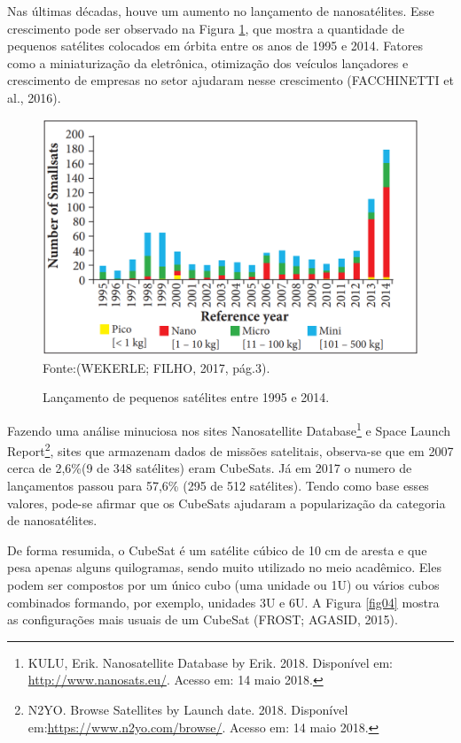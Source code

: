 Nas últimas décadas, houve um aumento no lançamento de nanosatélites. Esse crescimento pode ser observado na Figura \ref{fig03}, que mostra a quantidade de pequenos satélites colocados em órbita entre os anos de 1995 e 2014. Fatores como a miniaturização da eletrônica, otimização dos veículos lançadores e crescimento de empresas no setor ajudaram nesse crescimento (FACCHINETTI et al., 2016).

{\small
\begin{figure}[h]
	\centering
	\caption{Lançamento de pequenos satélites entre 1995 e 2014.}
	\includegraphics[keepaspectratio=true,scale=0.55]{figuras/lancamentoPequenoSatellite.PNG}
	Fonte:(WEKERLE; FILHO, 2017, pág.3).
	\label{fig03}
\end{figure}
}

Fazendo uma análise minuciosa nos sites Nanosatellite Database\footnote{ KULU, Erik. Nanosatellite Database by Erik. 2018. Disponível em: \url{http://www.nanosats.eu/}. Acesso em: 14 maio 2018.} e Space Launch Report\footnote{N2YO. Browse Satellites by Launch date. 2018. Disponível em:\url{https://www.n2yo.com/browse/}.  Acesso em: 14 maio 2018.}, sites que armazenam dados de missões satelitais, observa-se que em 2007 cerca de 2,6\%(9 de 348 satélites) eram CubeSats. Já em 2017 o numero de lançamentos passou para 57,6\% (295 de 512 satélites). Tendo como base esses valores, pode-se afirmar que os CubeSats ajudaram a popularização da categoria de nanosatélites.

De forma resumida, o CubeSat é um satélite cúbico de 10 cm de aresta e que pesa apenas alguns quilogramas, sendo muito utilizado no meio acadêmico. Eles podem ser compostos por um único cubo (uma unidade ou 1U) ou vários cubos combinados formando, por exemplo, unidades 3U e 6U. A Figura \ref{fig04} mostra as configurações mais usuais de um CubeSat (FROST; AGASID, 2015).

